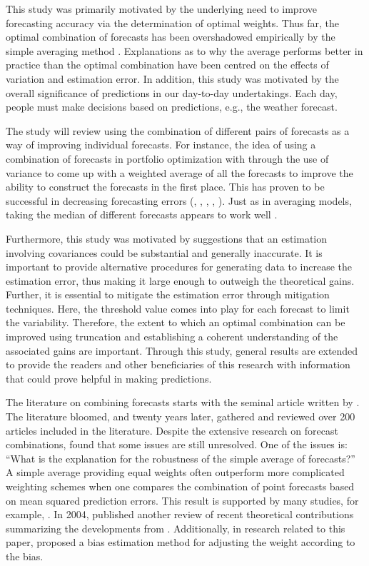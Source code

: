\documentclass[11pt]{article}
\begin{document}
	This study was primarily motivated by the underlying need to improve forecasting accuracy via the determination of optimal weights. Thus far, the optimal combination of forecasts has been overshadowed empirically by the simple averaging method \citep{Bates1969}. Explanations as to why the average performs better in practice than the optimal combination have been centred on the effects of variation and estimation error. In addition, this study was motivated by the overall significance of predictions in our day-to-day undertakings. Each day, people must make decisions based on predictions, e.g., the weather forecast. 
	
	The study will review using the combination of different pairs of forecasts as a way of improving individual forecasts. For instance, the idea of using a combination of forecasts in portfolio optimization with through the use of variance to come up with a weighted average of all the forecasts to improve the ability to construct the forecasts in the first place. This has proven to be successful in decreasing forecasting errors (\cite{Clemen1989}, \cite{Diebold1996}, \cite{Chen1999} , \cite{Dunis2000}, \cite{Stock2004}). Just as in averaging models, taking the median of different forecasts appears to work well \citep{Claeskens2014}.
	
	Furthermore, this study was motivated by suggestions that an estimation involving covariances could be substantial and generally inaccurate. It is important to provide alternative procedures for generating data to increase the estimation error, thus making it large enough to outweigh  the theoretical gains. Further, it is essential to mitigate the estimation error through mitigation techniques. Here, the threshold value comes into play for each forecast to limit the variability. Therefore, the extent to which an optimal combination can be improved using truncation and establishing a coherent understanding of the associated gains are important. Through this study, general results are extended to provide the readers and other beneficiaries of this research with information that could prove helpful in making predictions.
	
	The literature on combining forecasts starts with the seminal article written by \cite{Bates1969}. The literature bloomed, and twenty years later, \cite{Clemen1989} gathered and reviewed over 200 articles included in the literature. Despite the extensive research on forecast combinations, \citeauthor{Clemen1989} found that some issues are still unresolved. One of the issues is: “What is the explanation for the robustness of the simple average of forecasts?” A simple average providing equal weights often outperform more complicated weighting schemes when one compares the combination of point forecasts based on mean squared prediction errors. This result is supported by many studies, for example, \citep{Stock2004}. In 2004, \citeauthor{Elliot2004} published another review of recent theoretical contributions summarizing the developments from \cite{Clemen1989}. Additionally, in research related to this paper, \cite{Gibbs2017} proposed a bias estimation method for adjusting the weight according to the bias.
	
\end{document}

